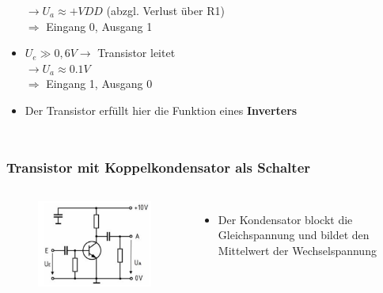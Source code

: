 \begin{frame}
\begin{columns}
\begin{itemize}
        $\rightarrow U_a \approx +VDD$ (abzgl. Verlust über R1)\\
        $\Rightarrow$ Eingang 0, Ausgang 1
      \item $U_e \gg 0,6 V \rightarrow$ Transistor leitet\\
        $\rightarrow U_a \approx 0.1 V$\\
        $\Rightarrow$ Eingang 1, Ausgang 0
      \item Der Transistor erfüllt hier die Funktion eines \textbf{Inverters}
    \end{itemize}
  \end{columns}
\end{frame}

\begin{frame}
  \frametitle{Transistor mit Koppelkondensator als Schalter}
  \begin{columns}
    \begin{center}
      \begin{figure}
        \includegraphics[width=\textwidth,height=.85\textheight,keepaspectratio]{a06/Transistor-Schalter+C.png}
      \end{figure}
    \end{center}
    \begin{itemize}
      \item Der Kondensator blockt die Gleichspannung und bildet den Mittelwert der Wechselspannung
    \end{itemize}
  \end{columns}
\end{frame}

